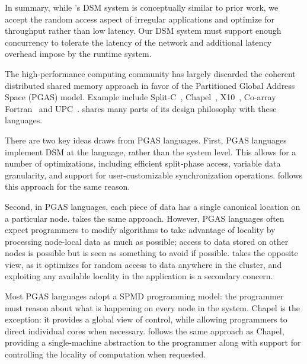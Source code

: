 In summary, while \Grappa's DSM system is conceptually similar to prior work,
we accept the random access aspect of irregular applications and optimize for
throughput rather than low latency. Our DSM system must support enough 
concurrency to tolerate the latency of the network and additional latency
overhead impose by the runtime system.

\vspace{0.5ex}
The high-performance computing community has largely discarded the
coherent distributed shared memory approach in favor of the
Partitioned Global Address Space (PGAS)
model. Example include Split-C~\cite{Krishnamurthy:1993:PPS:169627.169724},
Chapel~\cite{Chamberlain:2007}, X10~\cite{X10:2005},
Co-array Fortran~\cite{Numrich:1998:CFP:289918.289920} and
UPC~\cite{upc:2005}. \Grappa shares many parts of its design philosophy
with these languages.

There are two key ideas \Grappa draws from PGAS languages. First, PGAS
languages implement DSM at the language, rather than the system
level. This allows for a number of optimizations, including efficient
split-phase access, variable data granularity, and support for
user-customizable synchronization operations. \Grappa follows this
approach for the same reason.

Second, in PGAS languages, each piece of data has a single canonical location
on a particular node. \Grappa takes the same approach. However, PGAS languages
often expect programmers to modify algorithms to take advantage of locality by
processing node-local data as much as possible; access to data stored on other
nodes is possible but is seen as something to avoid if possible. \Grappa takes
the opposite view, as it optimizes for random access to data anywhere in the
cluster, and exploiting any available locality in the application is a
secondary concern.

Most PGAS languages adopt a SPMD programming model: the programmer
must reason about what is happening on every node in the
system. Chapel is the exception: it provides a global view of control,
while allowing programmers to direct individual cores when
necessary. \Grappa follows the same approach as Chapel, providing a
single-machine abstraction to the programmer along with support for
controlling the locality of computation when requested.


